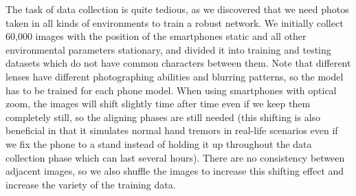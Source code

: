 The task of data collection is quite tedious, as we discovered that we need photos taken in all kinds of environments to train a robust network. We initially collect 60,000 images with the position of the smartphones static and all other environmental parameters stationary, and divided it into training and testing datasets which do not have common characters between them. Note that different lenses have different photographing abilities and blurring patterns, so the model has to be trained for each phone model. When using smartphones with optical zoom, the images will shift slightly time after time even if we keep them completely still, so the aligning phases are still needed (this shifting is also beneficial in that it simulates normal hand tremors in real-life scenarios even if we fix the phone to a stand instead of holding it up throughout the data collection phase which can last several hours). There are no consistency between adjacent images, so we also shuffle the images to increase this shifting effect and increase the variety of the training data. %

